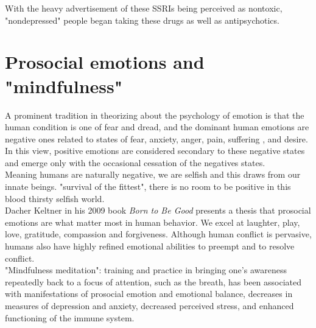 \documentclass{article}
\begin{document}
With the heavy advertisement of these SSRIs being perceived as nontoxic, "nondepressed" people began taking these drugs as well as antipsychotics. 

\section{Prosocial emotions and "mindfulness"}
A prominent tradition in theorizing about the psychology of emotion is that the human condition is one of fear and dread, and the dominant human emotions are negative ones related to states of fear, anxiety, anger, pain, suffering , and desire. In this view, positive emotions are considered secondary to these negative states and emerge only with the occasional cessation of the negatives states. \\
Meaning humans are naturally negative, we are selfish and this draws from our innate beings. "survival of the fittest", there is no room to be positive in this blood thirsty selfish world. \\ 

Dacher Keltner in his 2009 book \textit{Born to Be Good} presents a thesis that prosocial emotions are what matter most in human behavior. We excel at laughter, play, love, gratitude, compassion and forgiveness. Although human conflict is pervasive, humans also have highly refined emotional abilities to preempt and to resolve conflict. \\ 

"Mindfulness meditation": training and practice in bringing one's awareness repeatedly back to a focus of attention, such as the breath, has been associated with manifestations of prosocial emotion and emotional balance, decreases in measures of depression and anxiety, decreased perceived stress, and enhanced functioning of the immune system. 
\end{document}
